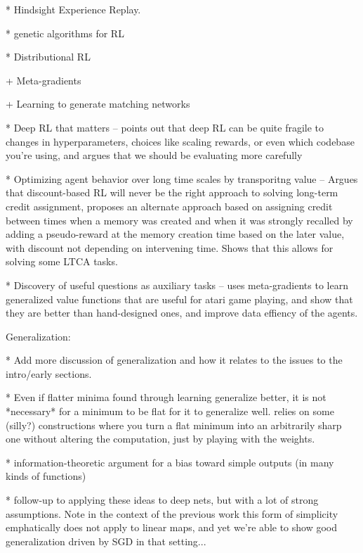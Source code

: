 * Hindsight Experience Replay. \citep{Andrychowicz2017}

* genetic algorithms for RL \citep{Petroski2018}

* Distributional RL \citep{Bellemare2017}

+ Meta-gradients \citep{Xu2018a}

+ Learning to generate matching networks \citep{Li2019a}

* Deep RL that matters -- points out that deep RL can be quite fragile to changes in hyperparameters, choices like scaling rewards, or even which codebase you're using, and argues that we should be evaluating more carefully \citep{Henderson2018}

* Optimizing agent behavior over long time scales by transporitng value -- Argues that discount-based RL will never be the right approach to solving long-term credit assignment, proposes an alternate approach based on assigning credit between times when a memory was created and when it was strongly recalled by adding a pseudo-reward at the memory creation time based on the later value, with discount not depending on intervening time. Shows that this allows for solving some LTCA tasks. \citep{Hung2019}

* Discovery of useful questions as auxiliary tasks -- uses meta-gradients to learn generalized value functions that are useful for atari game playing, and show that they are better than hand-designed ones, and improve data effiency of the agents. \citep{Veeriah2019}


Generalization:

* Add more discussion of generalization and how it relates to the issues to the intro/early sections.

* Even if flatter minima found through learning generalize better, it is not *necessary* for a minimum to be flat for it to generalize well. relies on some (silly?) constructions where you turn a flat minimum into an arbitrarily sharp one without altering the computation, just by playing with the weights. \citep{Dinh2017} 

* information-theoretic argument for a bias toward simple outputs (in many kinds of functions) \citep{Dingle2018}

* follow-up to \citep{Dingle2018} applying these ideas to deep nets, but with a lot of strong assumptions. \citep{Perez2019} Note in the context of the previous work this form of simplicity emphatically does not apply to linear maps, and yet we're able to show good generalization driven by SGD in that setting...  


